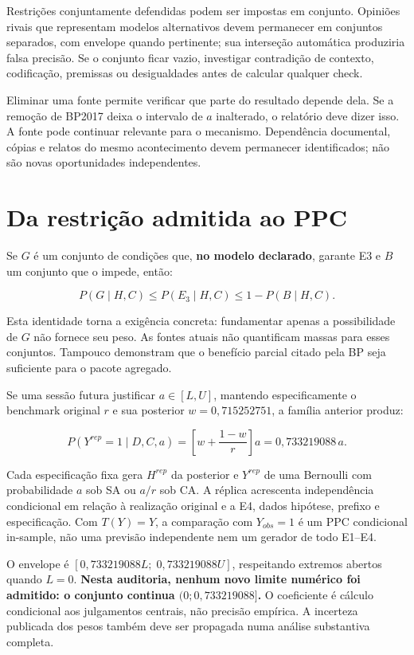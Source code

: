 \documentclass[
  brazilian,
  11pt,
  a4paper,
]{article}
\begin{document}
Restrições conjuntamente defendidas podem ser impostas em conjunto.
Opiniões rivais que representam modelos alternativos devem permanecer em
conjuntos separados, com envelope quando pertinente; sua interseção
automática produziria falsa precisão. Se o conjunto ficar vazio,
investigar contradição de contexto, codificação, premissas ou
desigualdades antes de calcular qualquer check.

Eliminar uma fonte permite verificar que parte do resultado depende
dela. Se a remoção de BP2017 deixa o intervalo de \(a\) inalterado, o
relatório deve dizer isso. A fonte pode continuar relevante para o
mecanismo. Dependência documental, cópias e relatos do mesmo
acontecimento devem permanecer identificados; não são novas
oportunidades independentes.

\section{Da restrição admitida ao
PPC}\label{da-restriuxe7uxe3o-admitida-ao-ppc}

Se \(G\) é um conjunto de condições que, \textbf{no modelo declarado},
garante E3 e \(B\) um conjunto que o impede, então:

\[P(G\mid H,C)\leq P(E_3\mid H,C)\leq1-P(B\mid H,C).\]

Esta identidade torna a exigência concreta: fundamentar apenas a
possibilidade de \(G\) não fornece seu peso. As fontes atuais não
quantificam massas para esses conjuntos. Tampouco demonstram que o
benefício parcial citado pela BP seja suficiente para o pacote agregado.

Se uma sessão futura justificar \(a\in[L,U]\), mantendo especificamente
o benchmark original \(r\) e sua posterior \(w=0,715252751\), a família
anterior produz:

\[P(Y^{rep}=1\mid D,C,a)=\left[w+\frac{1-w}{r}\right]a
=0,733219088\,a.\]

Cada especificação fixa gera \(H^{rep}\) da posterior e \(Y^{rep}\) de
uma Bernoulli com probabilidade \(a\) sob SA ou \(a/r\) sob CA. A
réplica acrescenta independência condicional em relação à realização
original e a E4, dados hipótese, prefixo e especificação. Com
\(T(Y)=Y\), a comparação com \(Y_{obs}=1\) é um PPC condicional
in-sample, não uma previsão independente nem um gerador de todo E1--E4.

O envelope é \([0,733219088L;\;0,733219088U]\), respeitando extremos
abertos quando \(L=0\). \textbf{Nesta auditoria, nenhum novo limite
numérico foi admitido: o conjunto continua \((0;0,733219088]\).} O
coeficiente é cálculo condicional aos julgamentos centrais, não precisão
empírica. A incerteza publicada dos pesos também deve ser propagada numa
análise substantiva completa.
\end{document}
